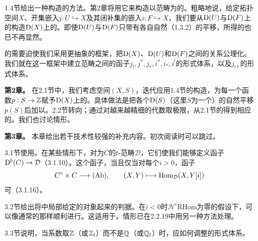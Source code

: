 1.4节给出一种构造的方法。第2章将用它来构造以范畴为的。粗略地说，给定拓扑空间$X$、开集嵌入$j:U\hookrightarrow X$及其闭补集的嵌入$i:F\hookrightarrow X$，我们要从$\mathrm{D}(U)$与$\mathrm{D}(F)$上的构造$\mathrm{D}(X)$上的。即使$\mathrm{D}(U)$与$\mathrm{D}(F)$只带有各自自然（1.3.2）的平移，所得的也已不再显然。

的需要迫使我们采用更抽象的框架，把$\mathrm{D}(X)$、$\mathrm{D}(U)$和$\mathrm{D}(F)$之间的关系公理化。我们就在这一框架中建立范畴之间的函子$j_!,j^*,j_*,i^*,i_*,i^!$的形式体系，以及$j_{!*}$的形式体系。

\par\medskip\noindent\textbf{第2章。} 在2.1节中，我们考虑空间$(X,S)$，迭代应用1.4节的构造，为每一个函数$p:S\to\mathbb Z$赋予$\mathrm{D}(X)$上的。具体做法是把各个$\mathrm{D}(S)$（这里$S$为一个）的自然平移$p(S)$后加以。2.2节转向；通过对越来越精细的代数取极限，从2.1节的得到相应的。我们也讨论情形。

\par\medskip\noindent\textbf{第3章。} 本章给出若干技术性较强的补充内容。初次阅读时可以跳过。

3.1节使用。在某些情形下，对为$C$的$t$-范畴$\mathcal D$，它们使我们能够定义函子$\mathrm{D}^b(C)\to\mathcal D$（3.1.10）。这个函子，当且仅当对每个$i>0$，函子
\[
C^{\circ}\times C\longrightarrow(\mathrm{Ab}),\qquad
(X,Y)\longmapsto\operatorname{Hom}_{\mathcal D}(X,Y[i])
\]
可（3.1.16）。

3.2节给出将中局部给定的对象起来的判据。在$i<0$时$\mathcal H^i\mathrm{RHom}$为零的假设下，可以像通常的那样顺利进行。这适用于。情形已在2.2.19中用另一种方法处理。

3.3节说明，当系数取$\mathbb Z$（或$\mathbb Z_l$）而不是$\mathbb Q$（或$\mathbb Q_l$）时，应如何调整的形式体系。

